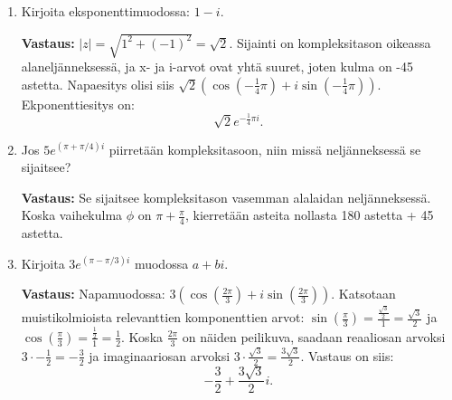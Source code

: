 \documentclass[a4paper,12pt]{article}
\begin{document}
\begin{enumerate}
\begin{enumerate}
    \item Kirjoita eksponenttimuodossa: $1-i$.
  
    \textbf{Vastaus:} $|z| = \sqrt{1^2+(-1)^2}=\sqrt{2}$. Sijainti on kompleksitason oikeassa alaneljänneksessä, ja x- ja i-arvot ovat yhtä suuret, joten kulma on -45 astetta. Napaesitys olisi siis $\sqrt{2}(\cos(-\frac{1}{4}\pi)+i\sin(-\frac{1}{4}\pi))$. Ekponenttiesitys on:
    \begin{equation*}
        \sqrt{2}e^{-\frac{1}{4}\pi i}.
    \end{equation*}

    
    \item Jos $5e^{(\pi+\pi/4)i}$ piirret\"a\"an kompleksitasoon, niin miss\"a nelj\"anneksess\"a se sijaitsee?

    \textbf{Vastaus:} Se sijaitsee kompleksitason vasemman alalaidan neljänneksessä. Koska vaihekulma $\phi$ on $\pi+\frac{\pi}{4}$, kierretään asteita nollasta 180 astetta + 45 astetta. 
    
    \item Kirjoita $3e^{(\pi-\pi/3)i}$ muodossa $a+bi$.

    \textbf{Vastaus:} Napamuodossa: $3(\cos(\frac{2\pi}{3})+i\sin(\frac{2\pi}{3}))$. Katsotaan muistikolmioista relevanttien komponenttien arvot: $\sin(\frac{\pi}{3})=\frac{\frac{\sqrt{3}}{2}}{1}=\frac{\sqrt{3}}{2}$ ja $\cos(\frac{\pi}{3})=\frac{\frac{1}{2}}{1}=\frac{1}{2}$. Koska $\frac{2\pi}{3}$ on näiden peilikuva, saadaan reaaliosan arvoksi $3\cdot-\frac{1}{2}=-\frac{3}{2}$ ja imaginaariosan arvoksi $3\cdot\frac{\sqrt{3}}{2}=\frac{3\sqrt{3}}{2}$. Vastaus on siis:
    \begin{equation*}
        -\frac{3}{2}+\frac{3\sqrt{3}}{2}i.
    \end{equation*}
\end{enumerate}

\end{enumerate}
\end{document}
